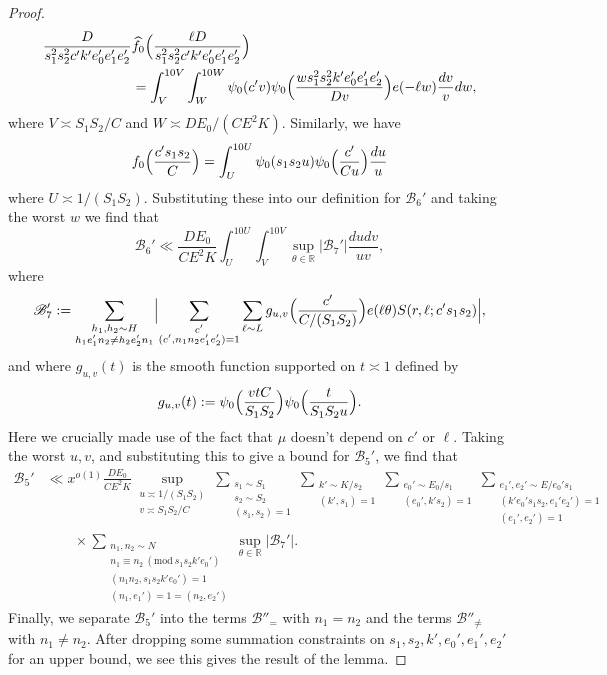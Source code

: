 \documentclass[10pt]{amsart}
\theoremstyle{plain}
\numberwithin{equation}{section}
\newcommand{\Mod}[1]{\ (\mathrm{mod}\ #1)}
\renewcommand{\hat}[1]{\widehat #1}
\begin{document}
\begin{proof}
\begin{align*}
\frac{D}{s_1^2s_2^2 c' k' e_0'e_1'e_2'}&\hat{f_0}\Bigl(\frac{\ell D}{s_1^2s_2^2 c' k' e_0'e_1'e_2'}\Bigr)\\
&=\int_{V}^{10V}\int_{W}^{10W}\psi_0(c' v)\psi_0\Bigl(\frac{ws_1^2s_2^2k'e_0'e_1'e_2'}{Dv}\Bigr)e(-\ell w)\frac{dv}{v}dw,
\end{align*}
where $V\asymp S_1S_2/C$ and $W\asymp DE_0/(C E^2 K)$. Similarly, we have
\[
f_0\Bigl(\frac{c's_1s_2}{C}\Bigr)=\int_{U}^{10U} \psi_0(s_1s_2 u)\psi_0\Bigl(\frac{c' }{C u}\Bigr)\frac{du}{u}
\]
where $U\asymp 1/(S_1S_2)$. Substituting these into our definition for $\mathscr{B}_6'$ and taking the worst $w$ we find that
\[
\mathscr{B}_6'\ll \frac{DE_0}{C E^2 K}\int_{U}^{10U}\int_V^{10V}\sup_{\theta\in\mathbb{R}}|\mathscr{B}_7'|\frac{du dv}{uv},
\]
where
\[
\mathscr{B}_7':=\sum_{\substack{h_1,h_2\sim H\\ h_1e_1'n_2\ne h_2e_2'n_1}}\Bigl|\sum_{\substack{c'\\ (c',n_1n_2e_1'e_2')=1}}\sum_{\ell\sim L}g_{u,v}\Bigl(\frac{c'}{C/(S_1S_2)}\Bigr)e(\ell \theta)S(r,\ell;c' s_1 s_2)\Bigr|,
\]
and where $g_{u,v}(t)$ is the smooth function supported on $t\asymp 1$ defined by
\[
g_{u,v}(t):=\psi_0\Bigl(\frac{vtC}{S_1S_2}\Bigr)\psi_0\Bigl(\frac{t}{S_1S_2 u}\Bigr).
\]
Here we crucially made use of the fact that $\mu$ doesn't depend on $c'$ or $\ell$. Taking the worst $u,v$, and substituting this to give a bound for $\mathscr{B}_5'$, we find that
\begin{align*}
\mathscr{B}_5'&\ll x^{o(1)}\frac{ D E_0}{C E^2 K}\sup_{\substack{u\asymp 1/(S_1S_2)\\ v\asymp S_1S_2/C}}\sum_{\substack{s_1\sim S_1\\ s_2\sim S_2\\ (s_1,s_2)=1}}\sum_{\substack{k'\sim K/s_2\\ (k',s_1)=1}} \sum_{\substack{e_0'\sim E_0/s_1\\ (e_0',k' s_2)=1}}\sum_{\substack{e_1',e_2'\sim E/e_0's_1\\ (k'e_0's_1s_2,e_1'e_2')=1\\ (e_1',e_2')=1}}\\
&\qquad \times\sum_{\substack{n_1,n_2\sim N\\ n_1\equiv n_2\Mod{s_1 s_2 k' e_0'}\\ (n_1n_2,s_1s_2 k' e_0')=1\\ (n_1,e_1')=1=(n_2,e_2')}}\sup_{\theta\in \mathbb{R}}|\mathscr{B}_7'|.
\end{align*}
Finally, we separate $\mathscr{B}_5'$ into the terms $\mathscr{B}''_=$ with $n_1=n_2$ and the terms $\mathscr{B}''_{\ne}$ with $n_1\ne n_2$. After dropping some summation constraints on $s_1,s_2,k',e_0',e_1',e_2'$ for an upper bound, we see this gives the result of the lemma.
\end{proof}
\end{document}
